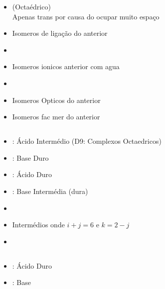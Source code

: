 \documentclass[12pt]{article}
\begin{document}
\begin{itemize}

	\item {} (Octaédrico)\\
		Apenas trans por causa do 
		ocupar muito espaço
		
	\item Isomeros de ligação do anterior
	
	\item {}
	
	\item Isomeros ionicos anterior com agua
	
	\item {}
	
	\item Isomeros Opticos do anterior
	\item Isomeros fac mer do anterior

\end{itemize}

\break

\subsection{}
\begin{itemize}
 
 	\item {}:	Ácido Intermédio (D9: Complexos Octaedricos)
	\item {}:	Base Duro
	\item {}:		Ácido Duro
	\item {}:		Base Intermédia (dura)
	
\end{itemize}
\vspace{2mm}
\begin{itemize}

	\item {}
	\item Intermédios  onde $i+j = 6$ e $k = 2-j$
	
	\item {}
	
\end{itemize}


\subsection{}
\begin{itemize}
	
	\item {}: Ácido Duro
	\item {}: Base
	
\end{itemize}
\end{document}
